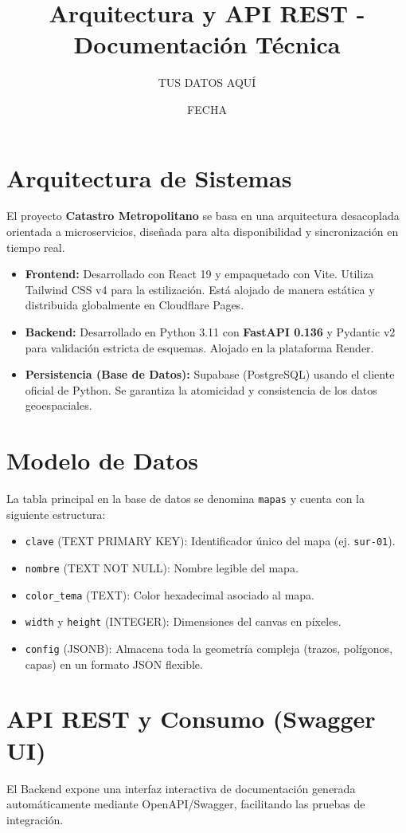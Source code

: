 \documentclass[12pt,a4paper]{article}
\title{Arquitectura y API REST - Documentación Técnica}
\author{TUS DATOS AQUÍ}
\date{FECHA}
\begin{document}
\maketitle
\tableofcontents
\newpage

\section{Arquitectura de Sistemas}
El proyecto \textbf{Catastro Metropolitano} se basa en una arquitectura desacoplada orientada a microservicios, diseñada para alta disponibilidad y sincronización en tiempo real.

\begin{itemize}
    \item \textbf{Frontend:} Desarrollado con React 19 y empaquetado con Vite. Utiliza Tailwind CSS v4 para la estilización. Está alojado de manera estática y distribuida globalmente en Cloudflare Pages.
    \item \textbf{Backend:} Desarrollado en Python 3.11 con \textbf{FastAPI 0.136} y Pydantic v2 para validación estricta de esquemas. Alojado en la plataforma Render.
    \item \textbf{Persistencia (Base de Datos):} Supabase (PostgreSQL) usando el cliente oficial de Python. Se garantiza la atomicidad y consistencia de los datos geoespaciales.
\end{itemize}

\section{Modelo de Datos}
La tabla principal en la base de datos se denomina \texttt{mapas} y cuenta con la siguiente estructura:
\begin{itemize}
    \item \texttt{clave} (TEXT PRIMARY KEY): Identificador único del mapa (ej. \texttt{sur-01}).
    \item \texttt{nombre} (TEXT NOT NULL): Nombre legible del mapa.
    \item \texttt{color\_tema} (TEXT): Color hexadecimal asociado al mapa.
    \item \texttt{width} y \texttt{height} (INTEGER): Dimensiones del canvas en píxeles.
    \item \texttt{config} (JSONB): Almacena toda la geometría compleja (trazos, polígonos, capas) en un formato JSON flexible.
\end{itemize}

\section{API REST y Consumo (Swagger UI)}
El Backend expone una interfaz interactiva de documentación generada automáticamente mediante OpenAPI/Swagger, facilitando las pruebas de integración.
\end{document}

